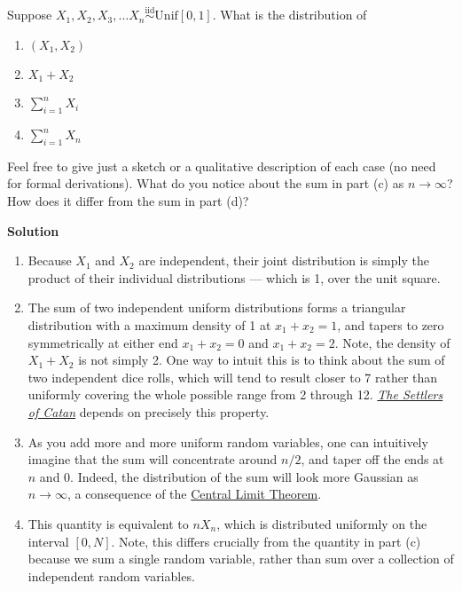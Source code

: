 \documentclass{harvardml}
\theoremstyle{definition}
\theoremstyle{plain}
\begin{document}
\begin{problem}
	Suppose $X_1, X_2, X_3, \ldots X_n \overset{\text{iid}}{\sim} \text{Unif}[0, 1].$
	What is the distribution of
	
	\begin{enumerate} [label=(\alph*)] 
	\item $(X_1, X_2)$
	\item $X_1 + X_2$
	\item $\sum_{i=1}^n X_i$
	\item $\sum_{i=1}^n X_n$
	\end{enumerate}
	
	Feel free to give just a sketch or a qualitative description of each case
	(no need for formal derivations). What do you notice about the sum in part
	(c) as $n \rightarrow \infty$? How does it differ from the sum in part (d)?

	\textbf{Solution}
	\begin{enumerate} [label=(\alph*)] 
		\item Because $X_1$ and $X_2$ are independent, their joint distribution
		is simply the product of their individual distributions --- which is 1,
		over the unit square.
		\item The sum of two independent uniform distributions forms a triangular
		distribution with a maximum density of 1 at $x_1 + x_2 = 1$, and tapers
		to zero symmetrically at either end $x_1 + x_2 = 0$ and $x_1 + x_2 = 2$.
		Note, the density of $X_1 + X_2$ is not simply 2. One way to intuit this
		is to think about the sum of two independent dice rolls, which will tend
		to result closer to 7 rather than uniformly covering the whole possible
		range from 2 through 12. \href{URLhttps://en.wikipedia.org/wiki/Catan}{\textit{The Settlers of Catan}}
		depends on precisely this property.
		\item As you add more and more uniform random variables, one can intuitively
		imagine that the sum will concentrate around $n / 2$, and taper off the
		ends at $n$ and $0$. Indeed, the distribution of the sum will look more Gaussian
		as $n \rightarrow \infty$, a consequence of the \href{https://en.wikipedia.org/wiki/Central_limit_theorem}{Central Limit Theorem}.
		\item This quantity is equivalent to $n X_n$, which is distributed
		uniformly on the interval $[0, N]$. Note, this differs crucially from
		the quantity in part (c) because we sum a single random variable, rather
		than sum over a collection of independent random variables.
	\end{enumerate}
\end{problem}
		
\end{document}
